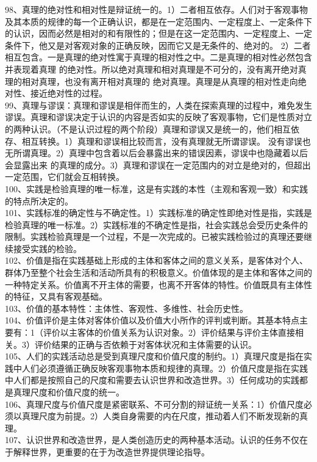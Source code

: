 \documentclass[a4paper,fleqn]{article}
\begin{document}
98、真理的绝对性和相对性是辩证统一的。1）二者相互依存。人们对于客观事物及其本质的规律的每一个正确认识，都是在一定范围内、一定程度上、一定条件下的认识，因而必然是相对的和有限性的；但是在这一定范围内、一定程度上、一定条件下，他又是对客观对象的正确反映，因而它又是无条件的、绝对的。 2）二者相互包含。一是真理的绝对性寓于真理的相对性之中。二是真理的相对性必然包含并表现着真理 的绝对性。所以绝对真理和相对真理是不可分的，没有离开绝对真理的相对真理，也没有离开相对真理的 绝对真理。真理是从真理的相对性走向绝对性、接近绝对性的过程。 \\
99、真理与谬误：真理和谬误是相伴而生的，人类在探索真理的过程中，难免发生谬误。真理和谬误决定于认识的内容是否如实的反映了客观事物，它们是性质对立的两种认识。（不是认识过程的两个阶段）真理和谬误又是统一的，他们相互依存、相互转换。1）真理和谬误相比较而言，没有真理就无所谓谬误。 没有谬误也无所谓真理。2）真理中包含着以后会暴露出来的错误因素，谬误中也隐藏着以后会显露出来 的真理的成分。3）真理和谬误在一定范围内的对立是绝对的，但超出一定范围，它们就会互相转换。 \\
100、实践是检验真理的唯一标准，这是有实践的本性（主观和客观一致）和实践的特点所决定的。 \\
101、实践标准的确定性与不确定性。1）实践标准的确定性即绝对性是指，实践是检验真理的唯一标准。2）实践标准的不确定性是指，社会实践总会受历史条件的限制。实践检验真理是一个过程，不是一次完成的。已被实践检验过的真理还要继续接受实践的检验。 \\
102、价值是指在实践基础上形成的主体和客体之间的意义关系，是客体对个人、群体乃至整个社会生活和活动所具有的积极意义。价值体现的是主体和客体之间的一种特定关系。价值离不开主体的需要，也离不开客体的特性。价值既具有主体性的特征，又具有客观基础。 \\
103、价值的基本特性：主体性、客观性、多维性、社会历史性。 \\
104、价值评价是主体对客体价值以及价值大小所作的评判或判断。其基本特点主要有：1（评价以主客体的价值关系为认识对象。2）评价结果与评价主体直接相关。3）评价结果的正确与否依赖于对客体状况和主体需要的认识。 \\
105、人们的实践活动总是受到真理尺度和价值尺度的制约。1）真理尺度是指在实践中人们必须遵循正确反映客观事物本质和规律的真理。2）价值尺度是指在实践中人们都是按照自己的尺度和需要去认识世界和改造世界。3）任何成功的实践都是真理尺度和价值尺度的统一。 \\
106、真理尺度与价值尺度是紧密联系、不可分割的辩证统一关系：1）价值尺度必须以真理尺度为前提。2）人类自身需要的内在尺度，推动着人们不断发现新的真理。 \\
107、认识世界和改造世界，是人类创造历史的两种基本活动。认识的任务不仅在于解释世界，更重要的在于为改造世界提供理论指导。 \\
\end{document}
